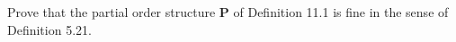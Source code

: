 Prove that the partial order structure $\mathbf{P}$ of Definition 11.1 is fine in the sense of Definition 5.21.
